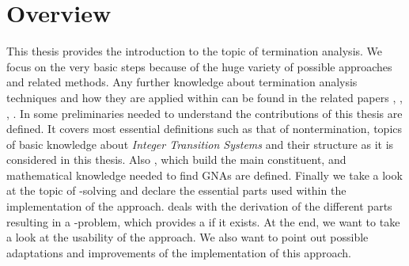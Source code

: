 \section{Overview}
\label{sec:overview}
This thesis provides the introduction to the topic of termination analysis. We focus on the very basic steps because of the huge variety of possible approaches and related methods. Any further knowledge about termination analysis techniques and how they are applied within \aprove can be found in the related papers \cite{giesl2017analyzing}, \cite{giesl2006aprove}, \cite{DBLP:stroder}, \cite{giesl2003aprove}.\newline
In  some preliminaries needed to understand the contributions of this thesis are defined. It covers most essential definitions such as that of nontermination, topics of basic knowledge about \textit{Integer Transition Systems} and their structure as it is considered in this thesis. Also \gnas, which build the main constituent, and mathematical knowledge needed to find GNAs are defined. Finally we take a look at the topic of -solving and declare the essential parts used within the implementation of the approach.\newline
{} deals with the derivation of the different parts resulting in a -problem, which provides a \gna if it exists. \newline
At the end, we want to take a look at the usability of the approach. We also want to point out possible adaptations and improvements of the implementation of this approach.